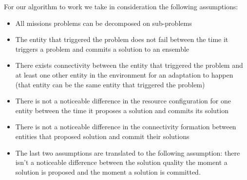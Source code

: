 \documentclass[journal]{IEEEtran}
\theoremstyle{definition}
\begin{document}
 
 For our algorithm to work we take in consideration the following assumptions:
\begin{itemize}
\item All missions problems can be decomposed on sub-problems
\item The entity that triggered the problem does not fail between the time it triggers a problem and commits a solution to an ensemble %
\item There exists connectivity between the entity that triggered the problem and at least one other entity in the environment for an adaptation to happen (that entity can be the same entity that triggered the problem)
\item There is not a noticeable difference in the resource configuration for one entity %
between the time it proposes a solution and commits its solution
\item There is not a noticeable difference in the %
connectivity formation between entities that proposed solution and commit their solutions
\item The last two assumptions are translated to the following assumption: %
there isn't a noticeable difference between the  solution  quality the moment  a solution is proposed and the moment a solution is committed.
\end{itemize}
\end{document}
